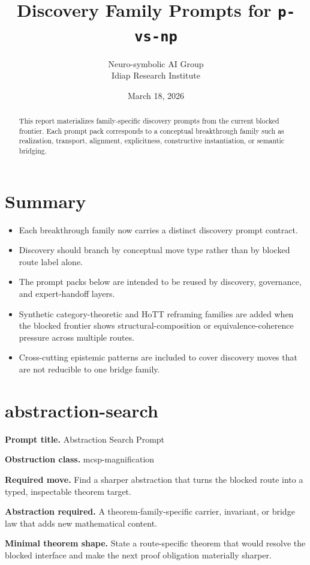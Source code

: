 \documentclass[11pt]{article}
\title{Discovery Family Prompts for \texttt{p-vs-np}}
\author{Neuro-symbolic AI Group\\Idiap Research Institute}
\date{March 18, 2026}
\begin{document}
\maketitle

\begin{abstract}
This report materializes family-specific discovery prompts from the current blocked frontier. Each prompt pack corresponds to a conceptual breakthrough family such as realization, transport, alignment, explicitness, constructive instantiation, or semantic bridging.
\end{abstract}

\section{Summary}
\begin{itemize}[leftmargin=*,itemsep=0.2em]
\item Each breakthrough family now carries a distinct discovery prompt contract.
\item Discovery should branch by conceptual move type rather than by blocked route label alone.
\item The prompt packs below are intended to be reused by discovery, governance, and expert-handoff layers.
\item Synthetic category-theoretic and HoTT reframing families are added when the blocked frontier shows structural-composition or equivalence-coherence pressure across multiple routes.
\item Cross-cutting epistemic patterns are included to cover discovery moves that are not reducible to one bridge family.
\end{itemize}

\section{abstraction-search}
\textbf{Prompt title.} Abstraction Search Prompt

\textbf{Obstruction class.} mcsp-magnification

\textbf{Required move.} Find a sharper abstraction that turns the blocked route into a typed, inspectable theorem target.

\textbf{Abstraction required.} A theorem-family-specific carrier, invariant, or bridge law that adds new mathematical content.

\textbf{Minimal theorem shape.} State a route-specific theorem that would resolve the blocked interface and make the next proof obligation materially sharper.
\end{document}
